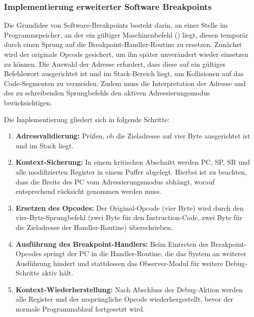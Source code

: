\subsubsection{Implementierung erweiterter Software Breakpoints}
\label{sec:ImplementierungSoftwareBreakpoints}

Die Grundidee von Software-Breakpoints besteht darin, an einer Stelle im Programmspeicher, an der ein g\"ultiger Maschinenbefehl () liegt, diesen tempor\"ar durch einen Sprung auf die Breakpoint-Handler-Routine zu ersetzen. Zun\"achst wird der originale Opcode gesichert, um ihn sp\"ater unver\"andert wieder einsetzen zu k\"onnen. Die Auswahl der Adresse erfordert, dass diese auf ein g\"ultiges Befehlswort ausgerichtet ist und im Stack-Bereich liegt, um Kollisionen auf das Code-Segmenten zu vermeiden. Zudem muss die Interpretation der Adresse und des zu schreibenden Sprungbefehls den aktiven Adressierungsmodus ber\"ucksichtigen.

Die Implementierung gliedert sich in folgende Schritte:
\begin{enumerate}
	\item \textbf{Adressvalidierung:} Pr\"ufen, ob die Zieladresse auf vier Byte ausgerichtet ist und im Stack liegt.
	  
	\item \textbf{Kontext-Sicherung:} In einem kritischen Abschnitt werden PC, SP, SR und alle modifizierten Register in einem Puffer abgelegt. Hierbei ist zu beachten, dass die Breite des PC vom Adressierungsmodus abh\"angt, worauf entsprechend r\"ucksicht genommen werden muss. 
	
	\item \textbf{Ersetzen des Opcodes:} Der Original-Opcode (vier Byte) wird durch den vier-Byte-Sprungbefehl (zwei Byte f\"ur den Instruction-Code, zwei Byte f\"ur die Zieladresse der Handler-Routine) \"uberschrieben. 
	
	\item \textbf{Ausf\"uhrung des Breakpoint-Handlers:} Beim Eintreten des Breakpoint-Opcodes springt der PC in die Handler-Routine, die das System an weiterer Ausf\"uhrung hindert und stattdessen das Observer-Modul f\"ur weitere Debug-Schritte aktiv h\"alt.
	
	\item \textbf{Kontext-Wiederherstellung:} Nach Abschluss der Debug-Aktion werden alle Register und der urspr\"ungliche Opcode wiederhergestellt, bevor der normale Programmablauf fortgesetzt wird.
\end{enumerate}

